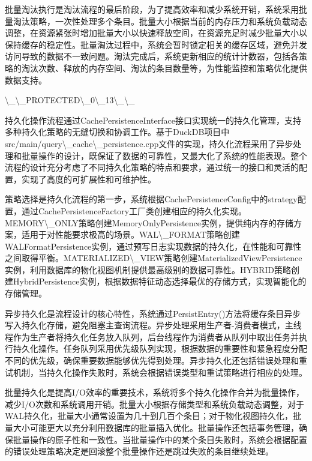 批量淘汰执行是淘汰流程的最后阶段，为了提高效率和减少系统开销，系统采用批量淘汰策略，一次性处理多个条目。批量大小根据当前的内存压力和系统负载动态调整，在资源紧张时增加批量大小以快速释放空间，在资源充足时减少批量大小以保持缓存的稳定性。批量淘汰过程中，系统会暂时锁定相关的缓存区域，避免并发访问导致的数据不一致问题。淘汰完成后，系统更新相应的统计计数器，包括各策略的淘汰次数、释放的内存空间、淘汰的条目数量等，为性能监控和策略优化提供数据支持。

\textbackslash{}_\textbackslash{}_PROTECTED\textbackslash{}_0\textbackslash{}_13\textbackslash{}_\textbackslash{}_

持久化操作流程通过CachePersistenceInterface接口实现统一的持久化管理，支持多种持久化策略的无缝切换和协调工作。基于DuckDB项目中src/main/query\textbackslash{}_cache\textbackslash{}_persistence.cpp文件的实现，持久化流程采用了异步处理和批量操作的设计，既保证了数据的可靠性，又最大化了系统的性能表现。整个流程的设计充分考虑了不同持久化策略的特点和要求，通过统一的接口和灵活的配置，实现了高度的可扩展性和可维护性。

策略选择是持久化流程的第一步，系统根据CachePersistenceConfig中的strategy配置，通过CachePersistenceFactory工厂类创建相应的持久化实现。MEMORY\textbackslash{}_ONLY策略创建MemoryOnlyPersistence实例，提供纯内存的存储方案，适用于对性能要求极高的场景。WAL\textbackslash{}_FORMAT策略创建WALFormatPersistence实例，通过预写日志实现数据的持久化，在性能和可靠性之间取得平衡。MATERIALIZED\textbackslash{}_VIEW策略创建MaterializedViewPersistence实例，利用数据库的物化视图机制提供最高级别的数据可靠性。HYBRID策略创建HybridPersistence实例，根据数据特征动态选择最优的存储方式，实现智能化的存储管理。

异步持久化是流程设计的核心特性，系统通过PersistEntry()方法将缓存条目异步写入持久化存储，避免阻塞主查询流程。异步处理采用生产者-消费者模式，主线程作为生产者将持久化任务放入队列，后台线程作为消费者从队列中取出任务并执行持久化操作。任务队列采用优先级队列实现，根据数据的重要性和紧急程度分配不同的优先级，确保重要数据能够优先得到处理。异步持久化还包括错误处理和重试机制，当持久化操作失败时，系统会根据错误类型和重试策略进行相应的处理。

批量持久化是提高I/O效率的重要技术，系统将多个持久化操作合并为批量操作，减少I/O次数和系统调用开销。批量大小根据存储类型和系统负载动态调整，对于WAL持久化，批量大小通常设置为几十到几百个条目；对于物化视图持久化，批量大小可能更大以充分利用数据库的批量插入优化。批量操作还包括事务管理，确保批量操作的原子性和一致性。当批量操作中的某个条目失败时，系统会根据配置的错误处理策略决定是回滚整个批量操作还是跳过失败的条目继续处理。

